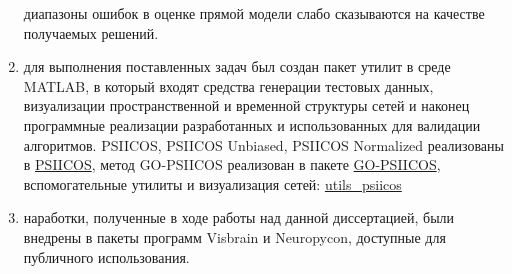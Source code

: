 \begin{enumerate}
      диапазоны ошибок в оценке прямой модели слабо сказываются на качестве
      получаемых решений.
  \item для выполнения поставленных задач был создан
      пакет утилит в среде MATLAB, в который входят средства генерации тестовых
      данных, визуализации пространственной и временной структуры сетей и наконец
      программные реализации разработанных и использованных для валидации алгоритмов.
      PSIICOS, PSIICOS Unbiased, PSIICOS Normalized реализованы в \href{https://github.com/dmalt/PSIICOS}{PSIICOS}, метод GO-PSIICOS реализован в пакете \href{https://github.com/dmalt/go-psiicos}{GO-PSIICOS}, вспомогательные утилиты и визуализация сетей: \href{https://github.com/dmalt/utils_psiicos}{utils\_psiicos}
  \item наработки, полученные в ходе работы над данной диссертацией,
      были внедрены в пакеты программ Visbrain и Neuropycon, доступные для публичного
      использования.
\end{enumerate}
